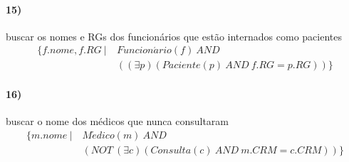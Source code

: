 \documentclass[12pt]{article}
\begin{document}
\paragraph{15)} buscar os nomes e RGs dos funcionários que estão internados como pacientes
\begin{align*}
    \{ f.nome, f.RG\ |\ & Funcion\acute{a}rio(f)\ AND\\
    & ((\exists p)(Paciente(p)\ AND\ f.RG = p.RG)) \}
\end{align*}

\paragraph{16)} buscar o nome dos médicos que nunca consultaram
\begin{align*}
    \{ m.nome\ |\ & M\acute{e}dico(m)\ AND\\
    & (NOT\ (\exists c)(Consulta(c)\ AND\ m.CRM = c.CRM)) \}
\end{align*}
\end{document}
